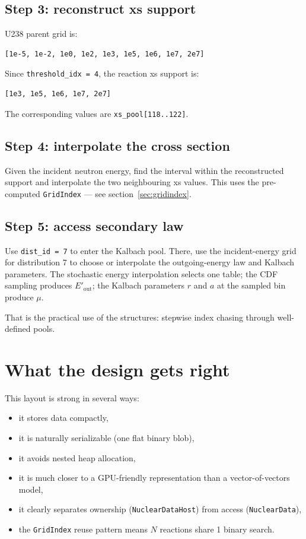 \documentclass[11pt,a4paper]{article}
\begin{document}
\subsection*{Step 3: reconstruct xs support}
U238 parent grid is:
\begin{lstlisting}
[1e-5, 1e-2, 1e0, 1e2, 1e3, 1e5, 1e6, 1e7, 2e7]
\end{lstlisting}
Since \texttt{threshold\_idx = 4}, the reaction xs support is:
\begin{lstlisting}
[1e3, 1e5, 1e6, 1e7, 2e7]
\end{lstlisting}
The corresponding values are \texttt{xs\_pool[118..122]}.

\subsection*{Step 4: interpolate the cross section}
Given the incident neutron energy, find the interval within the reconstructed support and interpolate the two neighbouring xs values. This uses the pre-computed \texttt{GridIndex} --- see section~\ref{sec:gridindex}.

\subsection*{Step 5: access secondary law}
Use \texttt{dist\_id = 7} to enter the Kalbach pool. There, use the incident-energy grid for distribution 7 to choose or interpolate the outgoing-energy law and Kalbach parameters. The stochastic energy interpolation selects one table; the CDF sampling produces $E'_\text{out}$; the Kalbach parameters $r$ and $a$ at the sampled bin produce $\mu$.

That is the practical use of the structures: stepwise index chasing through well-defined pools.

\section{What the design gets right}
This layout is strong in several ways:
\begin{itemize}[leftmargin=1.4em]
  \item it stores data compactly,
  \item it is naturally serializable (one flat binary blob),
  \item it avoids nested heap allocation,
  \item it is much closer to a GPU-friendly representation than a vector-of-vectors model,
  \item it clearly separates ownership (\texttt{NuclearDataHost}) from access (\texttt{NuclearData}),
  \item the \texttt{GridIndex} reuse pattern means $N$ reactions share 1 binary search.
\end{itemize}
\end{document}
